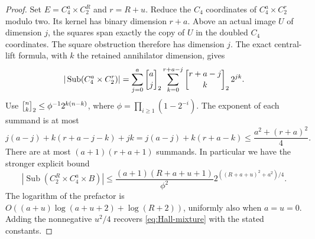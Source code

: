 \begin{proof}
Set $E=C_4^a\times C_2^R$ and $r=R+u$. Reduce the $C_4$ coordinates
of $C_4^a\times C_2^r$ modulo two. Its kernel has binary dimension
$r+a$. Above an actual image $U$ of dimension $j$, the squares span
exactly the copy of $U$ in the doubled $C_4$ coordinates. The square
obstruction therefore has dimension $j$. The exact central-lift formula,
with $k$ the retained annihilator dimension, gives
\[
 |\operatorname{Sub}(C_4^a\times C_2^r)|
 =\sum_{j=0}^a\gauss aj2
    \sum_{k=0}^{r+a-j}\gauss{r+a-j}k2\,2^{jk}.
\]
Use $\gauss nk2\leq\phi^{-1}2^{k(n-k)}$, where
$\phi=\prod_{i\geq1}(1-2^{-i})$. The exponent of each summand is at most
\[
 j(a-j)+k(r+a-j-k)+jk
 =j(a-j)+k(r+a-k)\leq\frac{a^2+(r+a)^2}{4}.
\]
There are at most $(a+1)(r+a+1)$ summands. In particular we have the
stronger explicit bound
\begin{equation}\label{eq:Hall-mixture-explicit}
 |\operatorname{Sub}(C_2^R\times C_4^a\times B)|
 \leq \frac{(a+1)(R+a+u+1)}{\phi^2}
       2^{((R+a+u)^2+a^2)/4}.
\end{equation}
The logarithm of the prefactor is
$O((a+u)\log(a+u+2)+\log(R+2))$, uniformly also when $a=u=0$.
Adding the nonnegative $u^2/4$ recovers \eqref{eq:Hall-mixture}
with the stated constants.
\end{proof}

